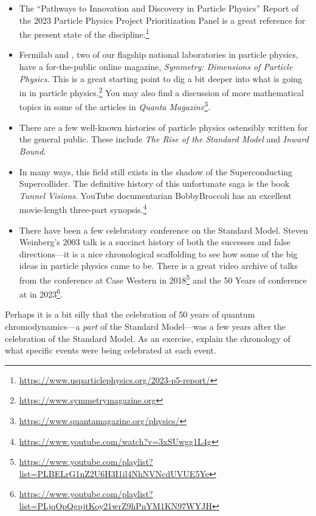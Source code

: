 \documentclass[12pt, oneside]{report}    %
\begin{document}
\begin{itemize}
    \item The ``Pathways to Innovation and Discovery in Particle Physics'' Report of the 2023 Particle Physics Project Prioritization Panel is a great reference for the present state of the discipline.\footnote{\url{https://www.usparticlephysics.org/2023-p5-report/}}
    \item Fermilab and , two of our flagship national laboratories in particle physics, have a for-the-public online magazine, \emph{Symmetry: Dimensions of Particle Physics}. This is a great starting point to dig a bit deeper into what is going in in particle physics.\footnote{\url{https://www.symmetrymagazine.org}} You may also find a discussion of more mathematical topics in some of the articles in \emph{Quanta Magazine}\footnote{\url{https://www.quantamagazine.org/physics/}}.
    \item There are a few well-known histories of particle physics ostensibly written for the general public. These include \emph{The Rise of the Standard Model}\autocite{hoddeson1997rise} and \emph{Inward Bound}\autocite{pais1988inward}. 
    \item In many ways, this field still exists in the shadow of the Superconducting Supercollider. The definitive history of this unfortunate saga is the book \emph{Tunnel Visions}\autocite{riordan2015tunnel}. YouTube documentarian BobbyBroccoli has an excellent movie-length three-part synopsis.\footnote{\url{https://www.youtube.com/watch?v=3xSUwgg1L4g}}
    \item There have been a few celebratory conference on the Standard Model. Steven Weinberg's 2003 talk is a succinct history of both the successes and false directions---it is a nice chronological scaffolding to see how some of the big ideas in particle physics came to be. There is a great video archive of talks from the  conference at Case Western in 2018\footnote{\url{https://www.youtube.com/playlist?list=PLBELrG1nZ2U6H3I1il4NhNVNcdUVUE5Ye}} and the 50 Years of  conference at  in 2023\footnote{\url{https://www.youtube.com/playlist?list=PLjqOpQgpjtKoy21wrZ9hPnYM1KN97WYJH}}.
\end{itemize}
\begin{exercise}
Perhaps it is a bit silly that the celebration of 50 years of quantum chromodynamics---a \emph{part} of the Standard Model---was a few years after the celebration of the Standard Model. As an exercise, explain the chronology of what specific events were being celebrated at each event.
\end{exercise}
\end{document}
